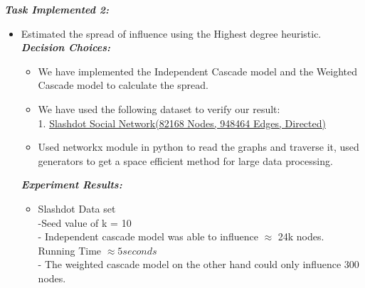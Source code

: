\documentclass[letterpaper,onecolumn,10pt]{article}
\begin{document}
\textbf{\textit{Task Implemented 2:}}
\begin{itemize}
\item Estimated the spread of influence using the Highest degree heuristic.\\
\textbf{\textit{Decision Choices:}}
\begin{itemize}
\item We have implemented the Independent Cascade model and the Weighted Cascade model to calculate the spread.
\item We have used the following dataset to verify our result:\\
1. \href{https://snap.stanford.edu/data/soc-Slashdot0902.html}{Slashdot Social Network(82168 Nodes, 948464 Edges, Directed)}
\item Used networkx module in python to read the graphs and traverse it, used  generators to get a space efficient method for large data processing.
\end{itemize}
\textbf{\textit{Experiment Results:}}
\begin{itemize}
\item Slashdot Data set\\
-Seed value of  k = 10\\
- Independent cascade model was able to influence $\approx$ 24k nodes. Running Time $\approx 5 seconds$ \\
- The weighted cascade model on the other hand could only influence 300 nodes.\\
\end{itemize}

\end{itemize}
\end{document}
